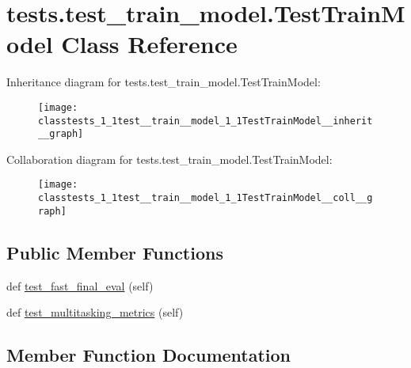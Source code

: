 \hypertarget{classtests_1_1test__train__model_1_1TestTrainModel}{}\section{tests.\+test\+\_\+train\+\_\+model.\+Test\+Train\+Model Class Reference}
\label{classtests_1_1test__train__model_1_1TestTrainModel}


Inheritance diagram for tests.\+test\+\_\+train\+\_\+model.\+Test\+Train\+Model\+:
\nopagebreak
\begin{figure}[H]
\begin{center}
\leavevmode
\texttt{[image: classtests\_1\_1test\_\_train\_\_model\_1\_1TestTrainModel\_\_inherit\_\_graph]}
\end{center}
\end{figure}


Collaboration diagram for tests.\+test\+\_\+train\+\_\+model.\+Test\+Train\+Model\+:
\nopagebreak
\begin{figure}[H]
\begin{center}
\leavevmode
\texttt{[image: classtests\_1\_1test\_\_train\_\_model\_1\_1TestTrainModel\_\_coll\_\_graph]}
\end{center}
\end{figure}
\subsection*{Public Member Functions}
\begin{DoxyCompactItemize}
\item 
def \hyperlink{classtests_1_1test__train__model_1_1TestTrainModel_affbd00e2cf6b61eae40b5f6e4c1cd8a9}{test\+\_\+fast\+\_\+final\+\_\+eval} (self)
\item 
def \hyperlink{classtests_1_1test__train__model_1_1TestTrainModel_a099516526ea34f8ad88bf921e94c01b9}{test\+\_\+multitasking\+\_\+metrics} (self)
\end{DoxyCompactItemize}


\subsection{Member Function Documentation}
\mbox{\label{classtests_1_1test__train__model_1_1TestTrainModel_affbd00e2cf6b61eae40b5f6e4c1cd8a9}} 
